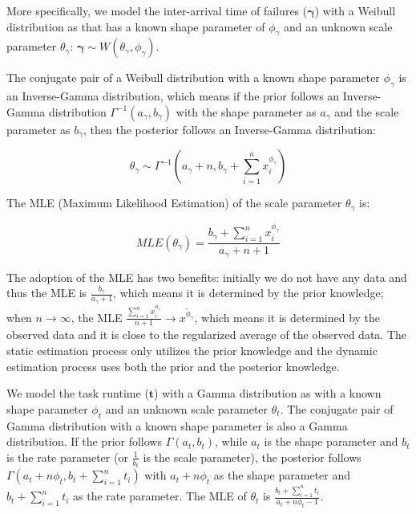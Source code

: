 More specifically, we model the inter-arrival time of failures ($\bm\gamma$) with a Weibull distribution as \cite{Schroeder2006} that has a known shape parameter of $\phi_{\gamma}$ and an unknown scale parameter $\theta_{\gamma}$: $\bm\gamma\sim W(\theta_{\gamma}, \phi_{\gamma})$. 

The conjugate pair of a Weibull distribution with a known shape parameter $\phi_{\gamma}$ is an Inverse-Gamma distribution, which means if the prior follows an Inverse-Gamma distribution $\Gamma^{-1}(a_{\gamma}, b_{\gamma})$ with the shape parameter as $a_{\gamma}$ and the scale parameter as $b_{\gamma}$, then the posterior follows an Inverse-Gamma distribution:

\begin{equation}
\label{eq:theta_1}
\theta_{\gamma}\sim\Gamma^{-1}(a_{\gamma}+n,\displaystyle b_{\gamma}+\sum_{i=1}^n{x_i^{\phi_{\gamma}}})
 \end{equation}

The MLE (Maximum Likelihood Estimation) of the scale parameter $\theta_{\gamma}$ is:

\begin{equation}
MLE(\theta_{\gamma})=\displaystyle\frac{b_{\gamma}+\displaystyle\sum_{i=1}^n{x_i^{\phi_{\gamma}}}}{a_{\gamma}+n+1}
\end{equation}

The adoption of the MLE has two benefits: initially we do not have any data and thus the MLE is $\displaystyle\frac{b_{\gamma}}{a_{\gamma}+1}$, which means it is determined by the prior knowledge; when $n\to\infty$, the MLE $\displaystyle\frac{\displaystyle\sum_{i=1}^n{x_i^{\phi_{\gamma}}}}{n+1}\to\overline{x^{\phi_{\gamma}}}$, which means it is determined by the observed data and it is close to the regularized average of the observed data. The static estimation process only utilizes the prior knowledge and the dynamic estimation process uses both the prior and the posterior knowledge. 

We model the task runtime ($\bm t$) with a Gamma distribution as \cite{Sun2003, Iosup2008} with a known shape parameter $\phi_{t}$ and an unknown scale parameter $\theta_t$. The conjugate pair of Gamma distribution with a known shape parameter is also a Gamma distribution. If the prior follows $\Gamma(a_t, b_t)$, while $a_t$ is the shape parameter and $b_t$ is the rate parameter (or $\displaystyle \frac{1}{b_t}$ is the scale parameter), the posterior follows $\Gamma(a_t+n\phi_t, b_t+\displaystyle\sum_{i=1}^n{t_i})$ with $a_t+n\phi_t$ as the shape parameter and $b_t+\displaystyle\sum_{i=1}^n{t_i}$ as the rate parameter. The MLE of $\theta_t$ is $\displaystyle\frac{b_t+\displaystyle\sum_{i=1}^n{t_i}}{a_t+n\phi_t-1}$. 


